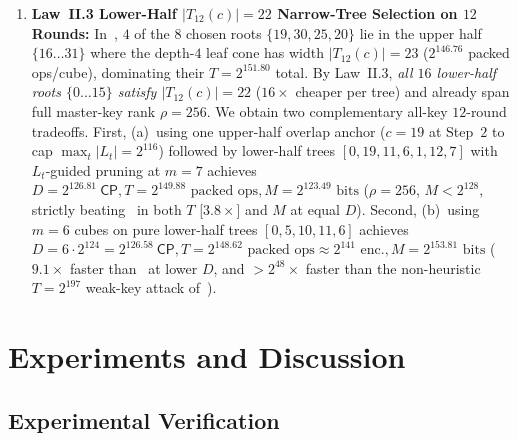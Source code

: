 \documentclass[11pt,a4paper]{article}
\theoremstyle{definition}
\theoremstyle{remark}
\newcommand{\CP}{\mathsf{CP}}
\begin{document}
\begin{enumerate}[leftmargin=1.8em]
    \item \textbf{Law~II.3 Lower-Half $|T_{12}(c)| = 22$ Narrow-Tree Selection on $12$ Rounds:} In~\cite[$\S$3.5, Table~11]{DG25}, $4$ of the $8$ chosen roots $\{19, 30, 25, 20\}$ lie in the upper half $\{16\dots 31\}$ where the depth-$4$ leaf cone has width $|T_{12}(c)| = 23$ ($2^{146.76}$ packed ops/cube), dominating their $T = 2^{151.80}$ total. By Law~II.3, \emph{all $16$ lower-half roots $\{0\dots 15\}$ satisfy $|T_{12}(c)| = 22$} ($16\times$ cheaper per tree) and already span full master-key rank $\rho = 256$. We obtain two complementary all-key $12$-round tradeoffs. First, (a)~using one upper-half overlap anchor ($c = 19$ at Step~$2$ to cap $\max_t |L_t| = 2^{116}$) followed by lower-half trees $[0, 19, 11, 6, 1, 12, 7]$ with $L_t$-guided pruning at $m = 7$ achieves $D = 2^{126.81}~\CP, T = 2^{149.88}\text{ packed ops}, M = 2^{123.49}\text{ bits}$ ($\rho = 256$, $M < 2^{128}$, strictly beating~\cite[$\S$3.5]{DG25} in both $T$ [$3.8\times$] and $M$ at equal $D$). Second, (b)~using $m = 6$ cubes on pure lower-half trees $[0, 5, 10, 11, 6]$ achieves $D = 6 \cdot 2^{124} = 2^{126.58}~\CP, T = 2^{148.62}\text{ packed ops} \approx 2^{141}\text{ enc.}, M = 2^{153.81}\text{ bits}$ ($9.1\times$ faster than~\cite[$\S$3.5]{DG25} at lower $D$, and $>2^{48}\times$ faster than the non-heuristic $T = 2^{197}$ weak-key attack of~\cite[Table~1]{BNS26}).
\end{enumerate}

\section{Experiments and Discussion}
\label{sec:experiments}

\subsection{Experimental Verification}
\label{subsec:exp-summary}
\end{document}
